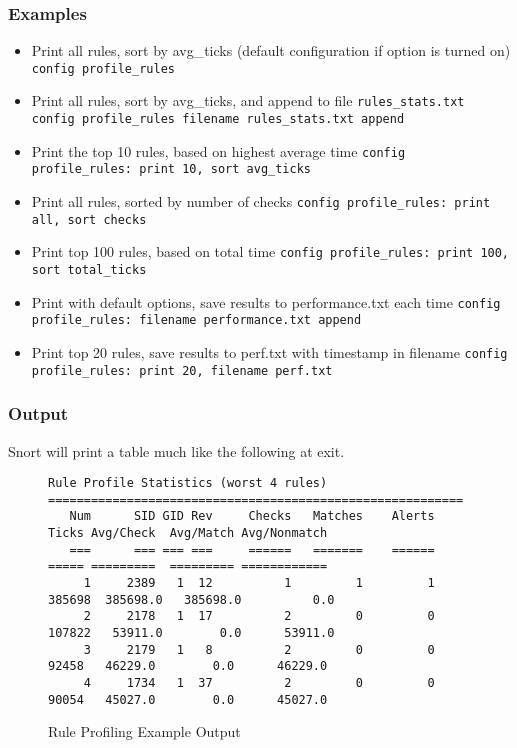 \documentclass[english]{report}
\begin{document}
\subsubsection{Examples}
\begin{itemize}

\item Print all rules, sort by avg\_ticks (default configuration if option is turned on)
\subitem \texttt{config profile\_rules}

\item Print all rules, sort by avg\_ticks, and append to file \texttt{rules\_stats.txt} 
\subitem \texttt{config profile\_rules filename \texttt{rules\_stats.txt} append}

\item Print the top 10 rules, based on highest average time
\subitem \texttt{config profile\_rules: print 10, sort avg\_ticks}

\item Print all rules, sorted by number of checks
\subitem \texttt{config profile\_rules: print all, sort checks}

\item Print top 100 rules, based on total time
\subitem \texttt{config profile\_rules: print 100, sort total\_ticks}

\item Print with default options, save results to performance.txt each time
\subitem \texttt{config profile\_rules: filename performance.txt append}

\item Print top 20 rules, save results to perf.txt with timestamp in filename
\subitem \texttt{config profile\_rules: print 20, filename perf.txt}

\end{itemize}

\subsubsection{Output}

Snort will print a table much like the following at exit.  

\begin{figure}
\footnotesize{
\begin{verbatim}
Rule Profile Statistics (worst 4 rules)
==========================================================
   Num      SID GID Rev     Checks   Matches    Alerts               Ticks Avg/Check  Avg/Match Avg/Nonmatch
   ===      === === ===     ======   =======    ======               ===== =========  ========= ============
     1     2389   1  12          1         1         1              385698  385698.0   385698.0          0.0
     2     2178   1  17          2         0         0              107822   53911.0        0.0      53911.0
     3     2179   1   8          2         0         0               92458   46229.0        0.0      46229.0
     4     1734   1  37          2         0         0               90054   45027.0        0.0      45027.0
\end{verbatim}
}
\caption{\label{rule profiling example output}Rule Profiling Example Output}
\end{figure}
\end{document}
